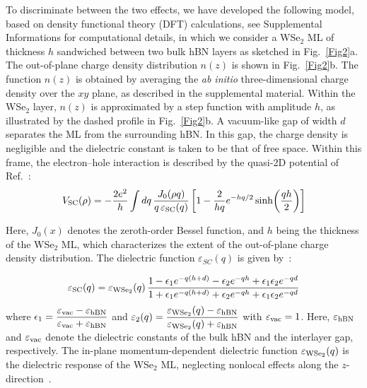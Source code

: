 \documentclass[twocolumn,showpacs,preprintnumbers,prl,fleqn,superscriptaddress]{revtex4-2}
\begin{document}
To discriminate between the two effects, we have developed the following model, based on density functional theory (DFT) calculations, see Supplemental Informations for computational details, in which we consider a WSe$_2$ ML of thickness $h$ sandwiched between two bulk hBN layers as sketched in Fig.~\ref{Fig2}a. The out-of-plane charge density distribution $n(z)$ is shown in Fig.~\ref{Fig2}b. The function $n(z)$ is obtained by averaging the \textit{ab initio} three-dimensional charge density over the $xy$ plane, as described in the supplemental material. Within the WSe$_2$ layer, $n(z)$ is approximated by a step function with amplitude $h$, as illustrated by the dashed profile in Fig.~\ref{Fig2}b. A vacuum-like gap of width $d$ separates the ML from the surrounding hBN. In this gap, the charge density is negligible and the dielectric constant is taken to be that of free space. Within this frame, the electron–hole interaction is described by the quasi-2D potential of Ref.~\cite{Latini2015}:
\begin{equation}
V_{\rm SC}(\rho)=-\frac{2e^{2}}{h}\int dq\,\frac{J_{0}(\rho q)}{q\,\varepsilon_{\rm SC}(q)}\left[1-\frac{2}{hq}e^{-hq/2}\sinh\biggl{(}\frac{qh}{2}\biggr{)}\right]
\end{equation}

Here, $J_{0}(x)$ denotes the zeroth-order Bessel function, and $h$ being the thickness of the WSe$_2$ ML, which characterizes the extent of the out-of-plane charge density distribution. The dielectric function $\varepsilon_{SC}(q)$ is given by~\cite{Florian2018}:

\begin{equation}
\varepsilon_{\rm SC}(q) = \varepsilon_{\rm WSe_{2}}(q)\,\frac{1-\epsilon_{1}e^{-q(h+d)} - \epsilon_{2}e^{-qh} + \epsilon_{1}\epsilon_{2}e^{-qd}}{1 + \epsilon_{1}e^{-q(h+d)} + \epsilon_{2}e^{-qh} + \epsilon_{1}\epsilon_{2}e^{-qd}}
\end{equation}
where $ \epsilon_{1} = \displaystyle \frac{\varepsilon_{\rm vac} - \varepsilon_{\rm hBN}}{\varepsilon_{\rm vac} + \varepsilon_{\rm hBN}}$ and $\varepsilon_{2}(q) = \displaystyle \frac{\varepsilon_{\rm WSe_{2}}(q) - \varepsilon_{\rm hBN}}{\varepsilon_{\rm WSe_{2}}(q) + \varepsilon_{\rm hBN}}$ with $\varepsilon_{\rm vac} = 1$. Here, $\varepsilon_{\rm hBN}$ and $\varepsilon_{\rm vac}$ denote the dielectric constants of the bulk hBN and the interlayer gap, respectively. The in-plane momentum-dependent dielectric function $\varepsilon_{\rm WSe_2}(q)$ is the dielectric response of the WSe$_2$ ML, neglecting nonlocal effects along the $z$-direction~\cite{Florian2018,rosner2015}.
\end{document}
